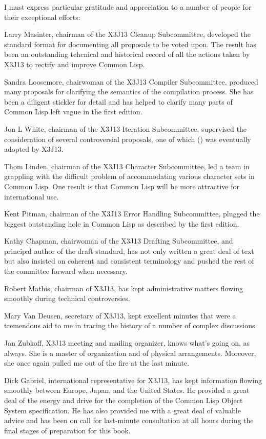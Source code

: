 I must express particular gratitude and appreciation to a number
of people for their exceptional efforts:

Larry Masinter, chairman of
the X3J13 Cleanup Subcommittee, developed the standard format for
documenting all proposals to be voted upon.  The result has been
an outstanding tehcnical and historical record of all the actions
taken by X3J13 to rectify and improve Common Lisp.

Sandra Loosemore, chairwoman of the X3J13 Compiler Subcommittee,
produced many proposals for clarifying the semantics of the compilation
process.  She has been a diligent stickler for detail and has helped
to clarify many parts of Common Lisp left vague in the first edition.

Jon L White, chairman of the X3J13 Iteration Subcommittee,
supervised the consideration of several controversial
proposals, one of which () was eventually adopted by X3J13.

Thom Linden, chairman of the X3J13 Character Subcommittee,
led a team in grappling with the difficult problem of accommodating
various character sets in Common Lisp.  One result is that
Common Lisp will be more attractive for international use.

Kent Pitman, chairman of the X3J13 Error Handling Subcommittee,
plugged the biggest outstanding
hole in Common Lisp as described by the first edition.

Kathy Chapman, chairwoman of the X3J13 Drafting Subcommittee,
and principal author of the draft standard, has not only written
a great deal of text but also insisted on coherent and consistent
terminology and pushed the rest of the committee forward when necessary.

Robert Mathis, chairman of X3J13, has kept administrative matters
flowing smoothly during technical controversies.

Mary Van Deusen, secretary of X3J13, kept excellent minutes
that were a tremendous aid to me in tracing the history of
a number of complex discussions.

Jan Zubkoff, X3J13 meeting and mailing
organizer, knows what's going on, as always.
She is a master of organization and of physical arrangements.
Moreover, she once again pulled me out of the fire at the last minute.

Dick Gabriel, international representative for X3J13,
has kept information flowing smoothly between Europe, Japan,
and the United States.  He provided a great deal of the energy and drive
for the completion of the Common Lisp Object System specification.
He has also provided me with a great
deal of valuable advice and has been on call for last-minute
consultation at all hours during the final stages of preparation
for this book.


